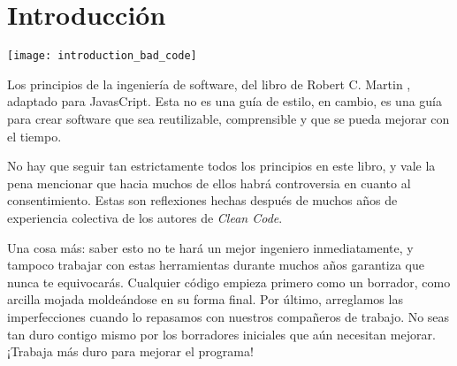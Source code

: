 \section{Introducción}

\begin{center}
  \texttt{[image: introduction\_bad\_code]} %
	\vspace{0.5cm} %
\end{center}

Los principios de la ingeniería de software, del libro de Robert C. Martin , adaptado para JavasCript. Esta no es una guía de estilo, en cambio, es una guía para crear software que sea reutilizable, comprensible y que se pueda mejorar con el tiempo.

No hay que seguir tan estrictamente todos los principios en este libro, y vale la pena mencionar que hacia muchos de ellos habrá controversia en cuanto al consentimiento. Estas son reflexiones hechas después de muchos años de experiencia colectiva de los autores de \textit{Clean Code}.

Una cosa más: saber esto no te hará un mejor ingeniero inmediatamente, y tampoco trabajar con estas herramientas durante muchos años garantiza que nunca te equivocarás. Cualquier código empieza primero como un borrador, como arcilla mojada moldeándose en su forma final. Por último, arreglamos las imperfecciones cuando lo repasamos con nuestros compañeros de trabajo. No seas tan duro contigo mismo por los borradores iniciales que aún necesitan mejorar. ¡Trabaja más duro para mejorar el programa!

